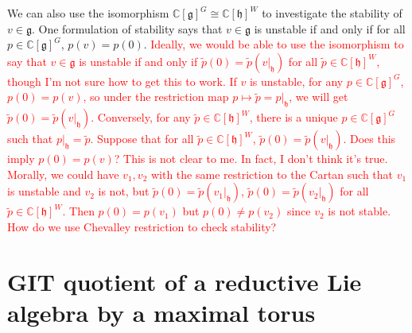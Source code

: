 \documentclass[12pt]{amsart}
\newcommand{\C}{\mathbb{C}}
\newcommand{\g}{\mathfrak{g}}
\newcommand{\h}{\mathfrak{h}}
\theoremstyle{remark}
\theoremstyle{remark}
\theoremstyle{remark}
\begin{document}
We can also use the isomorphism $\C[\g]^G \cong \C[\h]^W$ to investigate the stability of $v \in \g$.
One formulation of stability says that $v \in \g$ is unstable if and only if for all $p \in \C[\g]^G$, $p(v) = p(0)$.
\textcolor{red}{
Ideally, we would be able to use the isomorphism to say that $v \in \g$ is unstable if and only if $\tilde p(0) = \tilde p(\left. v \right|_\h)$ for all $\tilde p \in \C[\h]^W$, though I'm not sure how to get this to work.
If $v$ is unstable, for any $p \in \C[\g]^G$, $p(0) = p(v)$, so under the restriction map $p \mapsto \tilde p = \left. p \right|_\h$, we will get $\tilde p (0) = \tilde p (\left. v \right|_\h).$
Conversely, for any $\tilde p \in \C[\h]^W$, there is a unique $p \in \C[\g]^G$ such that $\left. p \right|_\h = \tilde p$.
Suppose that for all $\tilde p \in \C[\h]^W$, $\tilde p(0) = \tilde p(\left. v \right|_\h)$.
Does this imply $p(0) = p(v)$? 
This is not clear to me.
In fact, I don't think it's true.
Morally, we could have $v_1, v_2$ with the same restriction to the Cartan such that $v_1$ is unstable and $v_2$ is not, but $\tilde p(0) = \tilde p (\left. v_1 \right|_\h)$, $\tilde p(0) = \tilde p (\left. v_2 \right|_\h)$ for all $\tilde p \in \C[\h]^W$.
Then $p(0) = p(v_1)$ but $p(0) \ne p(v_2)$ since $v_2$ is not stable.
How do we use Chevalley restriction to check stability?
}


\section{GIT quotient of a reductive Lie algebra by a maximal torus}
\end{document}
